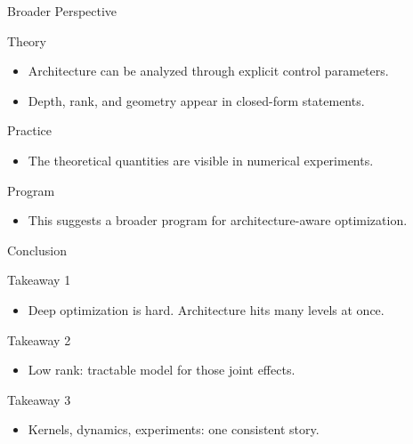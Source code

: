 \documentclass[aspectratio=169]{beamer}
\begin{document}
\begin{frame}{Broader Perspective}
  \begin{block}{Theory}
    \begin{itemize}
      \item Architecture can be analyzed through explicit control parameters.
      \item Depth, rank, and geometry appear in closed-form statements.
    \end{itemize}
  \end{block}
  \begin{exampleblock}{Practice}
    \begin{itemize}
      \item The theoretical quantities are visible in numerical experiments.
    \end{itemize}
  \end{exampleblock}
  \begin{alertblock}{Program}
    \begin{itemize}
      \item This suggests a broader program for architecture-aware optimization.
    \end{itemize}
  \end{alertblock}
\end{frame}

\begin{frame}{Conclusion}
  \begin{block}{Takeaway 1}
    \begin{itemize}
      \item Deep optimization is hard. Architecture hits many levels at once.
    \end{itemize}
  \end{block}
  \begin{exampleblock}{Takeaway 2}
    \begin{itemize}
      \item Low rank: tractable model for those joint effects.
    \end{itemize}
  \end{exampleblock}
  \begin{alertblock}{Takeaway 3}
    \begin{itemize}
      \item Kernels, dynamics, experiments: one consistent story.
    \end{itemize}
  \end{alertblock}
\end{frame}
\end{document}

